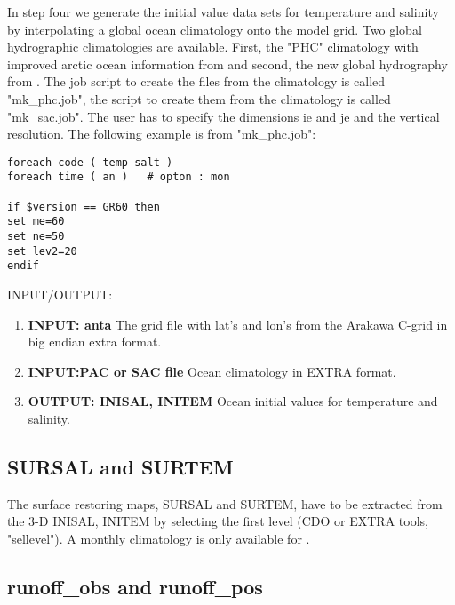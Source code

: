 In step four we generate the initial value data sets for temperature and salinity 
by interpolating a global ocean climatology onto the model grid.
Two global hydrographic climatologies are available. First, the "PHC" climatology
with improved arctic ocean information from \citet{Steele:2001} and second, 
the new global hydrography from \citet{Gouretski:2004}.
The job script to create the files from the \citet{Steele:2001} climatology is called
"mk\_phc.job", the script to create them from the \citet{Gouretski:2004} climatology is called
"mk\_sac.job". The user has to specify the dimensions ie and je and the vertical resolution.
The following example is from "mk\_phc.job":
\begin{footnotesize}
\begin{verbatim}
foreach code ( temp salt )
foreach time ( an )   # opton : mon

if $version == GR60 then
set me=60
set ne=50
set lev2=20
endif
\end{verbatim}
\end{footnotesize}

INPUT/OUTPUT:
\begin{enumerate}

\item \textbf{INPUT: anta} \newline
The grid file with lat's  and lon's from the Arakawa C-grid
in big endian extra format.

\item \textbf{INPUT:PAC or SAC file} \newline
Ocean climatology in EXTRA format.

\item \textbf{OUTPUT: INISAL, INITEM} \newline
Ocean initial values for temperature and salinity.

\end{enumerate}

\subsection{SURSAL and SURTEM}

The surface restoring maps, SURSAL and SURTEM, have to be extracted from the 3-D INISAL, INITEM
by selecting the first level (CDO or EXTRA tools, "sellevel"). A monthly climatology is only available 
for \citet{Steele:2001}.

\subsection{runoff\_obs and runoff\_pos}

